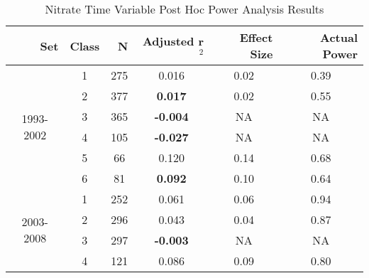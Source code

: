 \begin{table}[htbp]
  \centering
  \caption{Nitrate Time Variable Post Hoc Power Analysis Results}
    \begin{tabular}{rrrrrr}
    \toprule
    Set   & Class & N     & Adjusted r$^2$ & Effect Size & Actual Power \\
    \midrule
    \multicolumn{1}{c}{\multirow{6}[1]{*}{\begin{sideways}1993-2002\end{sideways}}} & \multicolumn{1}{c}{1} & \multicolumn{1}{c}{275} & \multicolumn{1}{c}{0.016 } & \multicolumn{1}{c}{0.02 } & \multicolumn{1}{c}{0.39 } \\
    \multicolumn{1}{c}{} & \multicolumn{1}{c}{2} & \multicolumn{1}{c}{377} & \multicolumn{1}{c}{\textbf{0.017 }} & \multicolumn{1}{c}{0.02 } & \multicolumn{1}{c}{0.55 } \\
    \multicolumn{1}{c}{} & \multicolumn{1}{c}{3} & \multicolumn{1}{c}{365} & \multicolumn{1}{c}{\textbf{-0.004 }} & \multicolumn{1}{c}{NA} & \multicolumn{1}{c}{NA} \\
    \multicolumn{1}{c}{} & \multicolumn{1}{c}{4} & \multicolumn{1}{c}{105} & \multicolumn{1}{c}{\textbf{-0.027 }} & \multicolumn{1}{c}{NA} & \multicolumn{1}{c}{NA} \\
    \multicolumn{1}{c}{} & \multicolumn{1}{c}{5} & \multicolumn{1}{c}{66} & \multicolumn{1}{c}{0.120 } & \multicolumn{1}{c}{0.14 } & \multicolumn{1}{c}{0.68 } \\
    \multicolumn{1}{c}{} & \multicolumn{1}{c}{6} & \multicolumn{1}{c}{81} & \multicolumn{1}{c}{\textbf{0.092 }} & \multicolumn{1}{c}{0.10 } & \multicolumn{1}{c}{0.64 } \\\midrule
    \multicolumn{1}{c}{\multirow{6}[2]{*}{\begin{sideways}2003-2008\end{sideways}}} & \multicolumn{1}{c}{1} & \multicolumn{1}{c}{252} & \multicolumn{1}{c}{0.061 } & \multicolumn{1}{c}{0.06 } & \multicolumn{1}{c}{0.94 } \\
    \multicolumn{1}{c}{} & \multicolumn{1}{c}{2} & \multicolumn{1}{c}{296} & \multicolumn{1}{c}{0.043 } & \multicolumn{1}{c}{0.04 } & \multicolumn{1}{c}{0.87 } \\
    \multicolumn{1}{c}{} & \multicolumn{1}{c}{3} & \multicolumn{1}{c}{297} & \multicolumn{1}{c}{\textbf{-0.003 }} & \multicolumn{1}{c}{NA} & \multicolumn{1}{c}{NA} \\
    \multicolumn{1}{c}{} & \multicolumn{1}{c}{4} & \multicolumn{1}{c}{121} & \multicolumn{1}{c}{0.086 } & \multicolumn{1}{c}{0.09 } & \multicolumn{1}{c}{0.80 } \\

\end{tabular}
\end{table}
